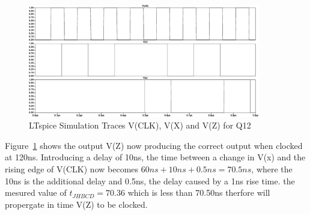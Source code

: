 \begin{figure}[!ht]
    \centering
    \includegraphics[width=0.9\textwidth]{inc/Q/Q12/Q12.pdf}
    \caption{LTspice Simulation Traces V(CLK), V(X) and V(Z) for Q12}\label{fig:Q11}
\end{figure}\FloatBarrier 

Figure~\ref{fig:Q11} shows the output V(Z) now producing the correct output when clocked at 120ns. Introducing a delay of 10ns, the time between a change in V(x) and the rising edge of V(CLK) now becomes $60ns + 10ns + 0.5ns= 70.5ns$, where the 10ns is the additional delay and 0.5ns, the delay caused by a 1ns rise time. the mesured value of $t_{JHBCD} = 70.36 $ which is less than 70.50ns therfore will propergate in time V(Z) to be clocked. 